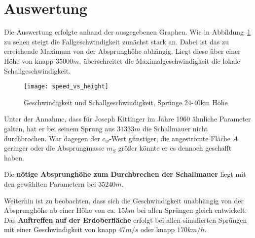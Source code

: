 \section{Auswertung}\label{sec:auswertung}

Die Auswertung erfolgte anhand der ausgegebenen Graphen.
Wie in Abbildung~\ref{fig:speed_vs_height} zu sehen steigt die Fallgeschwindigkeit zunächst stark an.
Dabei ist das zu erreichende Maximum von der Absprunghöhe abhängig.
Liegt diese über einer Höhe von knapp $35000m$, überschreitet die Maximalgeschwindigkeit die lokale Schallgeschwindigkeit.

\begin{figure}[h]
  \centering
  \texttt{[image: speed\_vs\_height]}
  \caption{Geschwindigkeit und Schallgeschwindigkeit, Sprünge 24-40km Höhe}
  \label{fig:speed_vs_height}
\end{figure}

Unter der Annahme, dass für Joseph Kittinger im Jahre 1960 ähnliche Parameter galten, hat er bei seinem Sprung aus $31333m$ die Schallmauer nicht durchbrochen.
War dagegen der $c_w$-Wert günstiger, die angeströmte Fläche $A$ geringer oder die Absprungmasse $m_S$ größer könnte er es dennoch geschafft haben.

Die \textbf{nötige Absprunghöhe zum Durchbrechen der Schallmauer} liegt mit den gewählten Parametern bei $35240m$.

Weiterhin ist zu beobachten, dass sich die Geschwindigkeit unabhängig von der Absprunghöhe ab einer Höhe von ca. $15km$ bei allen Sprüngen gleich entwickelt.
Das \textbf{Auftreffen auf der Erdoberfläche} erfolgt bei allen simulierten Sprüngen mit einer Geschwindigkeit von knapp $47m/s$ oder knapp $170km/h$.

